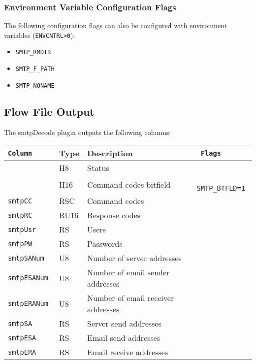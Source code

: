 \documentclass[documentation]{subfiles}
\begin{document}
\subsubsection{Environment Variable Configuration Flags}
The following configuration flags can also be configured with environment variables ({\tt ENVCNTRL>0}):
\begin{itemize}
    \item {\tt SMTP\_RMDIR}
    \item {\tt SMTP\_F\_PATH}
    \item {\tt SMTP\_NONAME}
\end{itemize}

\subsection{Flow File Output}
The smtpDecode plugin outputs the following columns:
\begin{longtable}{>{\tt}lll>{\tt\small}l}
    \toprule
    {\bf Column} & {\bf Type} & {\bf Description} & {\bf Flags}\\
    \midrule\endhead%
    \nameref{smtpStat} & H8   & Status                              & \\
    \nameref{smtpCBF}  & H16  & Command codes bitfield              & SMTP\_BTFLD=1\\
    smtpCC             & RSC  & Command codes                       & \\
    smtpRC             & RU16 & Response codes                      & \\
    smtpUsr            & RS   & Users                               & \\
    smtpPW             & RS   & Passwords                           & \\
    smtpSANum          & U8   & Number of server addresses          & \\
    smtpESANum         & U8   & Number of email sender addresses    & \\
    smtpERANum         & U8   & Number of email receiver addresses  & \\
    smtpSA             & RS   & Server send addresses               & \\
    smtpESA            & RS   & Email send addresses                & \\
    smtpERA            & RS   & Email receive addresses             & \\
    \bottomrule
\end{longtable}
\end{document}
